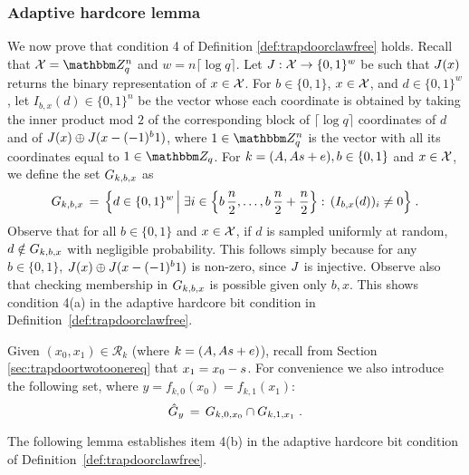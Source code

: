 \subsubsection{Adaptive hardcore lemma}
\label{sec:hc-lemma}
We now prove that condition 4 of Definition \ref{def:trapdoorclawfree} holds. 
Recall that $\sX=\mZ_q^n$ and $w=n\lceil \log q \rceil$. Let $J:\mathcal{X}\to\{0,1\}^w$  be such that $J(x)$ returns the binary representation of $x\in\mathcal{X}$. For $b\in\{0,1\}$, $x\in \mathcal{X}$, and $d\in\{0,1\}^w$, let
 $I_{b,x}(d) \in \{0,1\}^n$ be the vector whose each coordinate is obtained by taking the inner product mod $2$ of the corresponding block of $\lceil\log q\rceil$ coordinates of $d$ and of $\inj(x)\oplus \inj(x-(-1)^b\*1 )$, where $\*1 \in \mZ_q^n$ is the vector with all its coordinates equal to $1\in\mZ_q$. For $k = (\*A,\*A\*s + \*e), b\in\{0,1\}$ and $x\in\mathcal{X}$, we define the set $G_{k,b,x}$ as 
$$ G_{k,b,x}\,=\,\Big\{d\in \{0,1\}^w\,\Big|\; \exists i\in\Big\{b\,\frac{n}{2},\ldots,b\,\frac{n}{2}+\frac{n}{2}\Big\}:\,(I_{b,x}(d))_i \neq 0 \Big\}\;.$$
Observe that for all $b\in \{0,1\}$ and $x\in \mathcal{X}$, if $d$ is sampled uniformly at random, $d\notin G_{k,b,x}$ with negligible probability. This follows simply because for any $b\in\{0,1\}$, $\inj(x)\oplus \inj(x-(-1)^b\*1)$ is non-zero, since $J$ is injective. Observe also that checking membership in $G_{k,b,x}$ is possible given only $b,x$. This shows condition 4(a) in the adaptive hardcore bit condition in Definition~\ref{def:trapdoorclawfree}.

Given $(x_0,x_1)\in\mathcal{R}_k$ (where $k = (\*A,\*A\*s + \*e)$), recall from Section \ref{sec:trapdoortwotoonereq} that $x_1 = x_0 - \*s$. For convenience we also introduce the following set, where $y=f_{k,0}(x_0)=f_{k,1}(x_1)$:
\begin{equation}\label{eq:def-hatc}
\hat{G}_{y}\,=\,G_{k,0,x_0}\cap G_{k,1,x_1}\;.
\end{equation}

The following lemma establishes item 4(b) in the adaptive hardcore bit condition of Definition~\ref{def:trapdoorclawfree}. 

